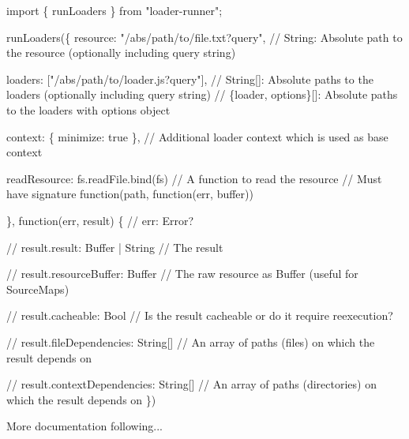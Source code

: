 
\begin{DoxyCode}
import \{ runLoaders \} from "loader-runner";

runLoaders(\{
    resource: "/abs/path/to/file.txt?query",
    // String: Absolute path to the resource (optionally including query string)

    loaders: ["/abs/path/to/loader.js?query"],
    // String[]: Absolute paths to the loaders (optionally including query string)
    // \{loader, options\}[]: Absolute paths to the loaders with options object

    context: \{ minimize: true \},
    // Additional loader context which is used as base context

    readResource: fs.readFile.bind(fs)
    // A function to read the resource
    // Must have signature function(path, function(err, buffer))

\}, function(err, result) \{
    // err: Error?

    // result.result: Buffer | String
    // The result

    // result.resourceBuffer: Buffer
    // The raw resource as Buffer (useful for SourceMaps)

    // result.cacheable: Bool
    // Is the result cacheable or do it require reexecution?

    // result.fileDependencies: String[]
    // An array of paths (files) on which the result depends on

    // result.contextDependencies: String[]
    // An array of paths (directories) on which the result depends on
\})
\end{DoxyCode}


More documentation following... 